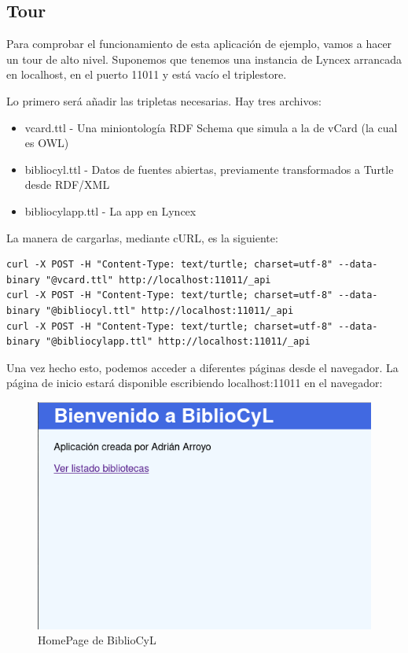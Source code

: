 \documentclass[12pt]{report} %
\begin{document}
\subsection{Tour}

Para comprobar el funcionamiento de esta aplicación de ejemplo, vamos a hacer un tour de alto nivel. Suponemos que tenemos una instancia de Lyncex arrancada en localhost, en el puerto 11011 y está vacío el triplestore.

Lo primero será añadir las tripletas necesarias. Hay tres archivos:
\begin{itemize}
    \item vcard.ttl - Una miniontología RDF Schema que simula a la de vCard (la cual es OWL)
    \item bibliocyl.ttl - Datos de fuentes abiertas, previamente transformados a Turtle desde RDF/XML
    \item bibliocylapp.ttl - La app en Lyncex
\end{itemize}

La manera de cargarlas, mediante cURL, es la siguiente:
\begin{verbatim}
curl -X POST -H "Content-Type: text/turtle; charset=utf-8" --data-binary "@vcard.ttl" http://localhost:11011/_api
curl -X POST -H "Content-Type: text/turtle; charset=utf-8" --data-binary "@bibliocyl.ttl" http://localhost:11011/_api
curl -X POST -H "Content-Type: text/turtle; charset=utf-8" --data-binary "@bibliocylapp.ttl" http://localhost:11011/_api
\end{verbatim}

Una vez hecho esto, podemos acceder a diferentes páginas desde el navegador. La página de inicio estará disponible escribiendo localhost:11011 en el navegador:
\begin{figure}
    \centering
    \includegraphics[width=\textwidth]{tour/bibliocyl1.png}
    \caption{HomePage de BiblioCyL}
    \label{fig:bibliocyl1}
\end{figure}
\end{document}

